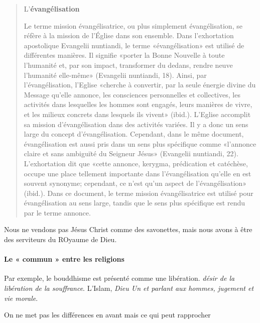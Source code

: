 \begin{quote}
    L’\textbf{évangélisation}

 Le terme mission évangélisatrice, ou plus simplement évangélisation, se réfère à la mission de l’Église dans son ensemble. Dans l’exhortation apostolique Evangelii nuntiandi, le terme «évangélisation» est utilisé de différentes manières. Il signifie «porter la Bonne Nouvelle à toute l’humanité et, par son impact, transformer du dedans, rendre neuve l’humanité elle-même» (Evangelii nuntiandi, 18). Ainsi, par l’évangélisation, l’Eglise «cherche à convertir, par la seule énergie divine du Message qu’elle annonce, les consciences personnelles et collectives, les activités dans lesquelles les hommes sont engagés, leurs manières de vivre, et les milieux concrets dans lesquels ils vivent» (ibid.). L’Eglise accomplit sa mission d’évangélisation dans des activités variées. Il y a donc un sens large du concept d’évangélisation. Cependant, dans le même document, évangélisation est aussi pris dans un sens plus spécifique comme «l’annonce claire et sans ambiguïté du Seigneur Jésus» (Evangelii nuntiandi, 22). L’exhortation dit que «cette annonce, kerygma, prédication et catéchèse, occupe une place tellement importante dans l’évangélisation qu’elle en est souvent synonyme; cependant, ce n’est qu’un aspect de l’évangélisation» (ibid.). Dans ce document, le terme mission évangélisatrice est utilisé pour évangélisation au sens large, tandis que le sens plus spécifique est rendu par le terme annonce.
\end{quote}


Nous ne vendons pas Jésus Christ comme des savonettes, mais nous avons à être des serviteurs du ROyaume de Dieu.

   \paragraph{Le « commun » entre les religions  }
Par exemple, le bouddhisme est présenté comme une libération. \textit{désir de la libération de la souffrance}. 
L'Islam, \textit{Dieu Un et parlant aux hommes, jugement et vie morale}.

\begin{Synthesis}
   On ne met pas les différences en avant mais ce qui peut rapprocher
\end{Synthesis}
